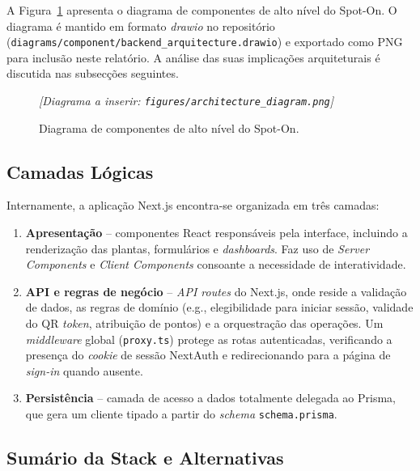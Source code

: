 \documentclass[11pt,a4paper]{article}
\begin{document}
A Figura~\ref{fig:arch} apresenta o diagrama de componentes de alto nível do
Spot-On. O diagrama é mantido em formato \emph{drawio} no repositório
(\texttt{diagrams/component/backend\_arquitecture.drawio}) e exportado como
PNG para inclusão neste relatório. A análise das suas implicações
arquiteturais é discutida nas subsecções seguintes.

\begin{figure}[H]
    \centering
    \vspace{1em}\textit{[Diagrama a inserir: \texttt{figures/architecture\_diagram.png}]}\vspace{1em}
    \caption{Diagrama de componentes de alto nível do Spot-On.}\label{fig:arch}
\end{figure}

\subsection{Camadas Lógicas}

Internamente, a aplicação Next.js encontra-se organizada em três camadas:

\begin{enumerate}[leftmargin=*]
    \item \textbf{Apresentação} -- componentes React responsáveis pela
          interface, incluindo a renderização das plantas, formulários e
          \emph{dashboards}. Faz uso de \emph{Server Components} e \emph{Client
              Components} consoante a necessidade de interatividade.
    \item \textbf{API e regras de negócio} -- \emph{API routes} do Next.js,
          onde reside a validação de dados, as regras de domínio (e.g.,
          elegibilidade para iniciar sessão, validade do QR \emph{token}, atribuição
          de pontos) e a orquestração das operações. Um \emph{middleware} global
          (\texttt{proxy.ts}) protege as rotas autenticadas, verificando a presença
          do \emph{cookie} de sessão NextAuth e redirecionando para a página de
          \emph{sign-in} quando ausente.
    \item \textbf{Persistência} -- camada de acesso a dados totalmente delegada
          ao Prisma, que gera um cliente tipado a partir do \emph{schema}
          \texttt{schema.prisma}.
\end{enumerate}

\subsection{Sumário da Stack e Alternativas}
\end{document}
